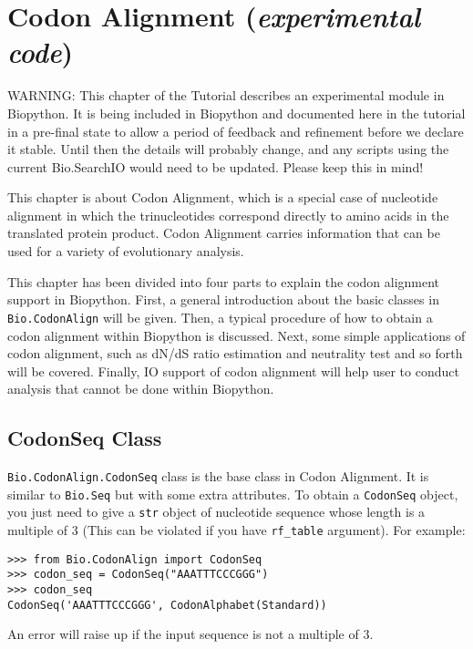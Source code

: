 \chapter{Codon Alignment (\textit{experimental code})}
\label{chap:codonalignment}

WARNING: This chapter of the Tutorial describes an experimental module in
Biopython. It is being included in Biopython and documented here in the
tutorial in a pre-final state to allow a period of feedback and refinement
before we declare it stable. Until then the details will probably change,
and any scripts using the current Bio.SearchIO would need to be updated.
Please keep this in mind!

This chapter is about Codon Alignment, which is a special case of
nucleotide alignment in which the trinucleotides correspond directly to
amino acids in the translated protein product. Codon Alignment carries
information that can be used for a variety of evolutionary analysis.

This chapter has been divided into four parts to explain the codon
alignment support in Biopython. First, a general introduction about the
basic classes in \verb|Bio.CodonAlign| will be given. Then, a typical
procedure of how to obtain a codon alignment within Biopython is
discussed. Next, some simple applications of codon alignment, such as
dN/dS ratio estimation and neutrality test and so forth will be covered.
Finally, IO support of codon alignment will help user to conduct
analysis that cannot be done within Biopython.

\section{CodonSeq Class}

\verb|Bio.CodonAlign.CodonSeq| class is the base class in Codon
Alignment. It is similar to \verb|Bio.Seq| but with some extra
attributes. To obtain a \verb|CodonSeq| object, you just need
to give a \verb|str| object of nucleotide sequence whose length is a
multiple of 3 (This can be violated if you have \texttt{rf\_table}
argument). For example:

\begin{verbatim}
>>> from Bio.CodonAlign import CodonSeq
>>> codon_seq = CodonSeq("AAATTTCCCGGG")
>>> codon_seq
CodonSeq('AAATTTCCCGGG', CodonAlphabet(Standard))
\end{verbatim}

An error will raise up if the input sequence is not a multiple of 3.

